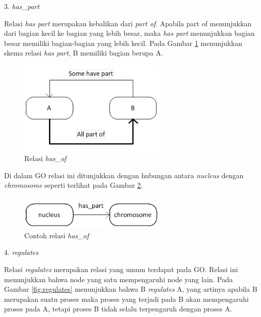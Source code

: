 \begin{flushleft}
3. \textit{has\_part}
\end{flushleft}\par
Relasi \textit{has part} merupakan kebalikan dari \textit{part of}. Apabila part of menunjukkan dari bagian kecil ke bagian yang lebih besar, maka \textit{has part} menunjukkan bagian besar memiliki bagian-bagian yang lebih kecil. Pada Gambar \ref{fig:has_part} menunjukkan skema relasi \textit{has part}, B memiliki bagian berupa A.
\begin{figure}[h!] %
	\centering
	\includegraphics[width=200pt]{has_part.png}
	\caption{Relasi \textit{has\_of}}
	\label{fig:has_part}
\end{figure}
\par
Di dalam GO relasi ini ditunjukkan dengan hubungan antara \textit{nucleus} dengan \textit{chromosome} seperti terlihat pada Gambar \ref{fig:contoh_has_part}.
\begin{figure}[h!] %
	\centering
	\includegraphics[width=200pt]{contoh_has_part.png}
	\caption{Contoh relasi \textit{has\_of}}
	\label{fig:contoh_has_part}
\end{figure}
\begin{flushleft}
4. \textit{regulates}
\end{flushleft}\par
Relasi \textit{regulates} merupakan relasi yang umum terdapat pada GO. Relasi ini menunjukkan bahwa node yang satu mempengaruhi node yang lain. Pada Gambar \ref{fig:regulates} menunjukkan bahwa B \textit{regulates} A, yang artinya apabila B merupakan suatu proses maka proses yang terjadi pada B akan mempengaruhi proses pada A, tetapi proses B tidak selalu terpengaruh dengan proses A.
